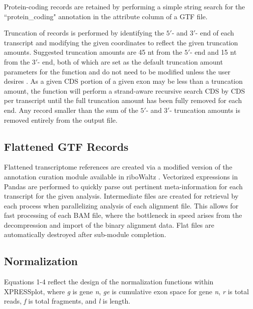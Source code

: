\documentclass[10pt, oneside]{article}
\begin{document}
\begin{multicols}{2}
Protein-coding records are retained by performing a simple string search for the ``protein\_coding" annotation in the attribute column of a GTF file. \par

Truncation of records is performed by identifying the $5'$- and $3'$- end of each transcript and modifying the given coordinates to reflect the given truncation amounts. Suggested truncation amounts are 45 nt from the $5'$- end and 15 nt from the $3'$- end, both of which are set as the default truncation amount parameters for the function and do not need to be modified unless the user desires \cite{ingolia_meth}. As a given CDS portion of a given exon may be less than a truncation amount, the function will perform a strand-aware recursive search CDS by CDS per transcript until the full truncation amount has been fully removed for each end. Any record smaller than the sum of the $5'$- and $3'$- truncation amounts is removed entirely from the output file. \par

\subsection*{Flattened GTF Records}
Flattened transcriptome references are created via a modified version of the annotation curation module available in riboWaltz \cite{ribowaltz}. Vectorized expressions in Pandas \cite{pandas} are performed to quickly parse out pertinent meta-information for each transcript for the given analysis. Intermediate files are created for retrieval by each process when parallelizing analysis of each alignment file. This allows for fast processing of each BAM file, where the bottleneck in speed arises from the decompression and import of the binary alignment data. Flat files are automatically destroyed after sub-module completion. \par

\subsection*{Normalization}
Equations 1-4 reflect the design of the normalization functions within XPRESSplot, where \textit{g} is gene \textit{n}, \textit{ge} is cumulative exon space for gene \textit{n}, \textit{r} is total reads, \textit{f} is total fragments, and \textit{l} is length.


\end{multicols}
\end{document}
